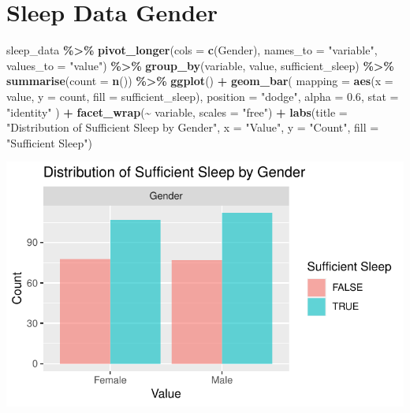 \documentclass[
  11pt,
]{article}
\newenvironment{Shaded}{\begin{snugshade}}{\end{snugshade}}
\newcommand{\AttributeTok}[1]{\textcolor[rgb]{0.13,0.29,0.53}{#1}}
\newcommand{\FloatTok}[1]{\textcolor[rgb]{0.00,0.00,0.81}{#1}}
\newcommand{\FunctionTok}[1]{\textcolor[rgb]{0.13,0.29,0.53}{\textbf{#1}}}
\newcommand{\NormalTok}[1]{#1}
\newcommand{\SpecialCharTok}[1]{\textcolor[rgb]{0.81,0.36,0.00}{\textbf{#1}}}
\newcommand{\StringTok}[1]{\textcolor[rgb]{0.31,0.60,0.02}{#1}}
\begin{document}
\hypertarget{sleep-data-gender}{%
\section{Sleep Data Gender}\label{sleep-data-gender}}

\begin{Shaded}
\begin{Highlighting}[]
\NormalTok{sleep\_data }\SpecialCharTok{\%\textgreater{}\%}
  \FunctionTok{pivot\_longer}\NormalTok{(}\AttributeTok{cols =} \FunctionTok{c}\NormalTok{(Gender), }\AttributeTok{names\_to =} \StringTok{"variable"}\NormalTok{, }\AttributeTok{values\_to =} \StringTok{"value"}\NormalTok{) }\SpecialCharTok{\%\textgreater{}\%}
  \FunctionTok{group\_by}\NormalTok{(variable, value, sufficient\_sleep) }\SpecialCharTok{\%\textgreater{}\%}
  \FunctionTok{summarise}\NormalTok{(}\AttributeTok{count =} \FunctionTok{n}\NormalTok{()) }\SpecialCharTok{\%\textgreater{}\%}
  \FunctionTok{ggplot}\NormalTok{() }\SpecialCharTok{+}
  \FunctionTok{geom\_bar}\NormalTok{(}
    \AttributeTok{mapping =} \FunctionTok{aes}\NormalTok{(}\AttributeTok{x =}\NormalTok{ value, }\AttributeTok{y =}\NormalTok{ count, }\AttributeTok{fill =}\NormalTok{ sufficient\_sleep),}
    \AttributeTok{position =} \StringTok{"dodge"}\NormalTok{,  }
    \AttributeTok{alpha =} \FloatTok{0.6}\NormalTok{,}
    \AttributeTok{stat =} \StringTok{"identity"}
\NormalTok{  ) }\SpecialCharTok{+}
  \FunctionTok{facet\_wrap}\NormalTok{(}\SpecialCharTok{\textasciitilde{}}\NormalTok{ variable, }\AttributeTok{scales =} \StringTok{"free"}\NormalTok{) }\SpecialCharTok{+}
  \FunctionTok{labs}\NormalTok{(}\AttributeTok{title =} \StringTok{"Distribution of Sufficient Sleep by Gender"}\NormalTok{,}
       \AttributeTok{x =} \StringTok{"Value"}\NormalTok{, }
       \AttributeTok{y =} \StringTok{"Count"}\NormalTok{, }
       \AttributeTok{fill =} \StringTok{"Sufficient Sleep"}\NormalTok{)}
\end{Highlighting}
\end{Shaded}

\begin{center}\includegraphics[width=0.7\linewidth]{SleepHelath_files/figure-latex/unnamed-chunk-8-1} \end{center}
\end{document}

